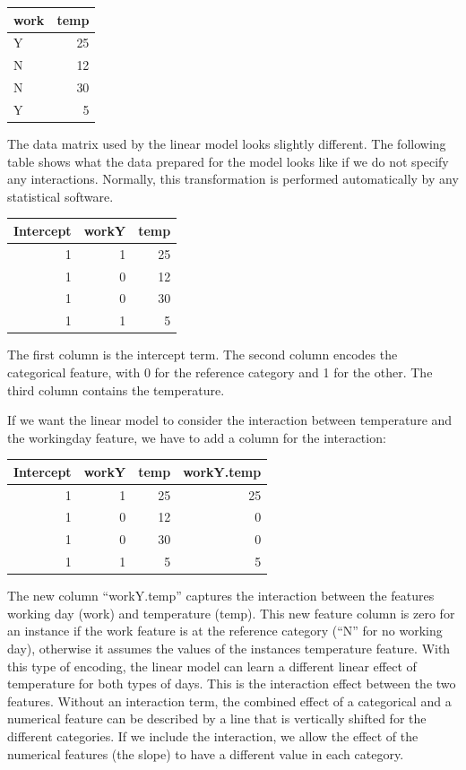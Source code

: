 \documentclass[
  11pt,
]{scrbook}
\begin{document}
\begin{table}
\centering
\begin{tabular}{lr}
\toprule
work & temp\\
\midrule
Y & 25\\
N & 12\\
N & 30\\
Y & 5\\
\bottomrule
\end{tabular}
\end{table}

The data matrix used by the linear model looks slightly different.
The following table shows what the data prepared for the model looks like if we do not specify any interactions.
Normally, this transformation is performed automatically by any statistical software.

\begin{table}
\centering
\begin{tabular}{rrr}
\toprule
Intercept & workY & temp\\
\midrule
1 & 1 & 25\\
1 & 0 & 12\\
1 & 0 & 30\\
1 & 1 & 5\\
\bottomrule
\end{tabular}
\end{table}

The first column is the intercept term.
The second column encodes the categorical feature, with 0 for the reference category and 1 for the other.
The third column contains the temperature.

If we want the linear model to consider the interaction between temperature and the workingday feature, we have to add a column for the interaction:

\begin{table}
\centering
\begin{tabular}{rrrr}
\toprule
Intercept & workY & temp & workY.temp\\
\midrule
1 & 1 & 25 & 25\\
1 & 0 & 12 & 0\\
1 & 0 & 30 & 0\\
1 & 1 & 5 & 5\\
\bottomrule
\end{tabular}
\end{table}

The new column ``workY.temp'' captures the interaction between the features working day (work) and temperature (temp).
This new feature column is zero for an instance if the work feature is at the reference category (``N'' for no working day), otherwise it assumes the values of the instances temperature feature.
With this type of encoding, the linear model can learn a different linear effect of temperature for both types of days.
This is the interaction effect between the two features.
Without an interaction term, the combined effect of a categorical and a numerical feature can be described by a line that is vertically shifted for the different categories.
If we include the interaction, we allow the effect of the numerical features (the slope) to have a different value in each category.
\end{document}
